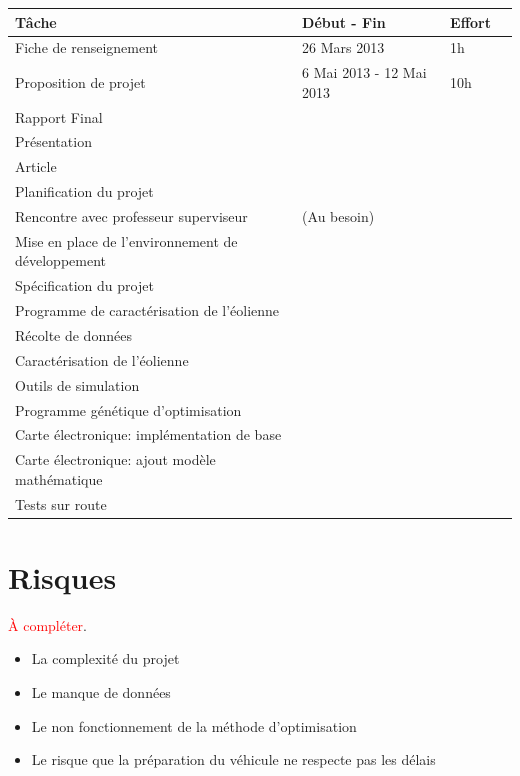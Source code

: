 \documentclass[11pt]{article}
\begin{document}
\begin{tabu} to \linewidth {Xlll}
  \bfseries Tâche & Début - Fin & Effort\\ \hline
  Fiche de renseignement & 26 Mars 2013 & 1h \\
  Proposition de projet  & 6 Mai 2013 - 12 Mai 2013 & 10h \\
  Rapport Final          & & \\
  Présentation           & & \\
  Article                & & \\
  Planification du projet & & \\
  \hline
  Rencontre avec professeur superviseur & (Au besoin) & \\
  \hline
  Mise en place de l'environnement de développement & & \\
  Spécification du projet & & \\
  \hline
  Programme de caractérisation de l'éolienne & & \\
  Récolte de données                         & & \\
  Caractérisation de l'éolienne              & & \\
  \hline
  Outils de simulation                   & & \\
  Programme génétique d'optimisation    & & \\
  \hline
  Carte électronique: implémentation de base    & & \\
  Carte électronique: ajout modèle mathématique & & \\
  \hline
  Tests sur route & & \\
  \hline
\end{tabu}

\section{Risques}

\textcolor{red}{À compléter}.

\begin{itemize}
  \item La complexité du projet
  \item Le manque de données
  \item Le non fonctionnement de la méthode d'optimisation
  \item Le risque que la préparation du véhicule ne respecte pas les délais
\end{itemize}
\end{document}
